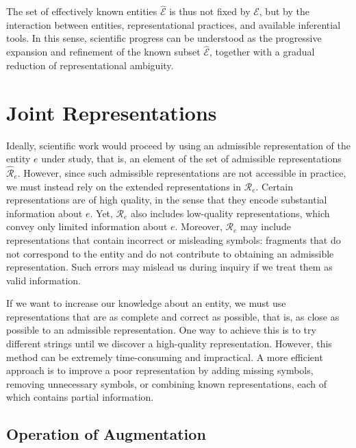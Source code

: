 The set of effectively known entities $\hat{\mathcal{E}}$ is thus not fixed by $\mathcal{E}$, but by the interaction between entities, representational practices, and available inferential tools. In this sense, scientific progress can be understood as the progressive expansion and refinement of the known subset $\hat{\mathcal{E}}$, together with a gradual reduction of representational ambiguity.

%
%

\section{Joint Representations}
\label{sec:joint_representations}


Ideally, scientific work would proceed by using an admissible representation of the entity $e$ under study, that is, an element of the set of admissible representations $\hat{\mathcal{R}}_{e}$. However, since such admissible representations are not accessible in practice, we must instead rely on the extended representations in $\mathcal{R}_e$. Certain representations are of high quality, in the sense that they encode substantial information about $e$. Yet, $\mathcal{R}_e$ also includes low-quality representations, which convey only limited information about $e$. Moreover, $\mathcal{R}_e$ may include representations that contain incorrect or misleading symbols: fragments that do not correspond to the entity and do not contribute to obtaining an admissible representation. Such errors may mislead us during inquiry if we treat them as valid information.

If we want to increase our knowledge about an entity, we must use representations that are as complete and correct as possible, that is, as close as possible to an admissible representation. One way to achieve this is to try different strings until we discover a high-quality representation. However, this method can be extremely time-consuming and impractical. A more efficient approach is to improve a poor representation by adding missing symbols, removing unnecessary symbols, or combining known representations, each of which contains partial information.


\subsection*{Operation of Augmentation}

